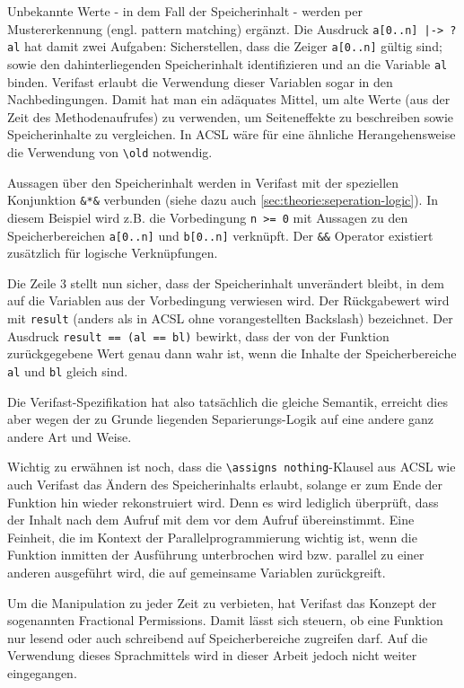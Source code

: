 Unbekannte Werte - in dem Fall der Speicherinhalt - werden per Mustererkennung (engl. pattern matching) ergänzt. 
Die Ausdruck \lstinline{a[0..n] |-> ?al} hat damit zwei Aufgaben: Sicherstellen, dass die Zeiger \lstinline{a[0..n]}
gültig sind; sowie den dahinterliegenden Speicherinhalt identifizieren und an die Variable \lstinline{al}
binden. Verifast erlaubt die Verwendung dieser Variablen sogar in den Nachbedingungen. Damit hat man ein 
adäquates Mittel, um alte Werte (aus der Zeit des Methodenaufrufes) zu verwenden, um Seiteneffekte zu
beschreiben sowie Speicherinhalte zu vergleichen. In ACSL wäre für eine ähnliche Herangehensweise
die Verwendung von \lstinline{\old} notwendig.

Aussagen über den Speicherinhalt werden in Verifast mit der speziellen Konjunktion \lstinline{&*&} 
verbunden (siehe dazu auch \ref{sec:theorie:seperation-logic}). In diesem Beispiel wird z.B. die Vorbedingung \lstinline{n >= 0} mit Aussagen zu den 
Speicherbereichen \lstinline{a[0..n]} und \lstinline{b[0..n]} verknüpft. Der \lstinline{&&} Operator 
existiert zusätzlich für logische Verknüpfungen.

Die Zeile 3 stellt nun sicher, dass der Speicherinhalt unverändert bleibt, in dem auf die Variablen aus 
der Vorbedingung verwiesen wird. Der Rückgabewert wird mit \lstinline{result} (anders als in ACSL ohne 
vorangestellten Backslash) bezeichnet. Der Ausdruck \lstinline{result == (al == bl)} 
bewirkt, dass der von der Funktion zurückgegebene Wert genau dann wahr ist, wenn die Inhalte der 
Speicherbereiche \lstinline{al} und \lstinline{bl} gleich sind.

Die Verifast-Spezifikation hat also tatsächlich die gleiche Semantik, erreicht dies aber wegen der 
zu Grunde liegenden Separierungs-Logik auf eine andere ganz andere Art und Weise.

Wichtig zu erwähnen ist noch, dass die \lstinline{\assigns nothing}-Klausel aus ACSL wie auch Verifast 
das Ändern des Speicherinhalts erlaubt, solange er zum Ende der Funktion hin wieder rekonstruiert wird.
Denn es wird lediglich überprüft, dass der Inhalt nach dem Aufruf mit dem vor
dem Aufruf übereinstimmt. Eine Feinheit, die im Kontext der Parallelprogrammierung wichtig ist, wenn
die Funktion inmitten der Ausführung unterbrochen wird bzw. parallel zu einer anderen ausgeführt wird,
die auf gemeinsame Variablen zurückgreift.

Um die Manipulation zu jeder Zeit zu verbieten, hat Verifast das Konzept der sogenannten Fractional Permissions.
Damit lässt sich steuern, ob eine Funktion nur lesend oder auch schreibend auf Speicherbereiche zugreifen darf.
Auf die Verwendung dieses Sprachmittels wird in dieser Arbeit jedoch nicht weiter eingegangen.



